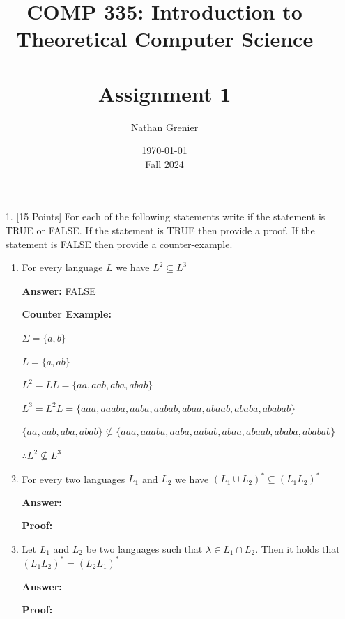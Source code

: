 \documentclass[12pt]{article}
\title{COMP 335: Introduction to Theoretical Computer Science\\
\ \\
Assignment 1}
\author{Nathan Grenier}
\date{\today \\ Fall 2024}
\begin{document}
\begin{spacing}{1.5}
	\maketitle

	\newpage

	\begin{enumerate}

		\item[1.] [15 Points] For each of the following statements write if the statement is TRUE or FALSE. If the statement is TRUE then provide a proof. If the statement is FALSE then provide a counter-example.

		      \begin{enumerate}

			      \item For every language $L$ we have $L^2 \subseteq L^3$

			            \noindent \textbf{Answer:} FALSE

			            \noindent \textbf{Counter Example:}

			            $\Sigma = \{a,b \}$

			            $L=\{a, ab \}$

			            $L^2=LL=\{aa, aab, aba, abab \}$

			            $L^3=L^2L=\{aaa, aaaba, aaba, aabab, abaa, abaab, ababa, ababab \}$

			            $\{aa, aab, aba, abab \} \not\subseteq \{aaa, aaaba, aaba, aabab, abaa, abaab, ababa, ababab \}$

			            $\therefore L^2 \not\subseteq L^3$


			      \item For every two languages $L_1$ and $L_2$ we have $(L_1 \cup L_2)^* \subseteq (L_1L_2)^*$

			            \noindent \textbf{Answer:}

			            \noindent \textbf{Proof:}

			      \item Let $L_1$ and $L_2$ be two languages such that $\lambda \in L_1 \cap L_2$. Then it holds that $(L_1L_2)^* = (L_2L_1)^*$

			            \noindent \textbf{Answer:}

			            \noindent \textbf{Proof:}

		      \end{enumerate}

		      \newpage


\end{enumerate}
\end{spacing}
\end{document}
